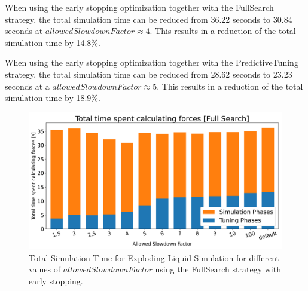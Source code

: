 \documentclass[conference]{IEEEtran}
\begin{document}
\begin{description}[style=nextline]
    \item[FullSearch (\autoref{fig:full_search})]
        When using the early stopping optimization together with the FullSearch strategy, the total simulation time
        can be reduced from 36.22 seconds to 30.84 seconds at $allowedSlowdownFactor \approx4$. This results in a reduction of the total simulation time by 14.8\%.
    \item[PredictiveTuning (\autoref{fig:predictive_tuning})]
        When using the early stopping optimization together with the PredictiveTuning strategy, the total simulation time can be reduced from 28.62 seconds to 23.23 seconds at a $allowedSlowdownFactor \approx5$. This results in a reduction of the total simulation time by 18.9\%.
\end{description}

\begin{figure}[H]
    \centering

    \includegraphics[width=\columnwidth]{../data/explodingLiquid/cluster/fullSearch/analytics/total_time_average.png}

    \caption{Total Simulation Time for Exploding Liquid Simulation for different values of $allowedSlowdownFactor$ using the FullSearch strategy with early stopping.}
    \label{fig:full_search}
\end{figure}
\end{document}
